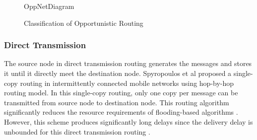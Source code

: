 \begin{figure}
	\centering
 {OppNetDiagram}
	\caption{Classification of Opportunistic Routing}
	\label{fig:bg:RoutingInOppNets}
\end{figure}


\subsubsection{Direct Transmission}
\label{bg:Opportunistic Networks:Classification of Opportunistic Routing:DT}
The source node in direct transmission routing generates the messages and stores it until it directly meet the destination node.
Spyropoulos et al \cite{Spyropoulos2004} proposed a single-copy routing in intermittently connected mobile networks using hop-by-hop routing model.
In this single-copy routing, only one copy per message can be transmitted from source node to destination node.
This routing algorithm significantly reduces the resource requirements of flooding-based algorithms \cite{Spyropoulos2008}.
However, this scheme produces significantly long delays since the delivery delay is unbounded for this direct transmission routing \cite{Grossglauser2002}.

